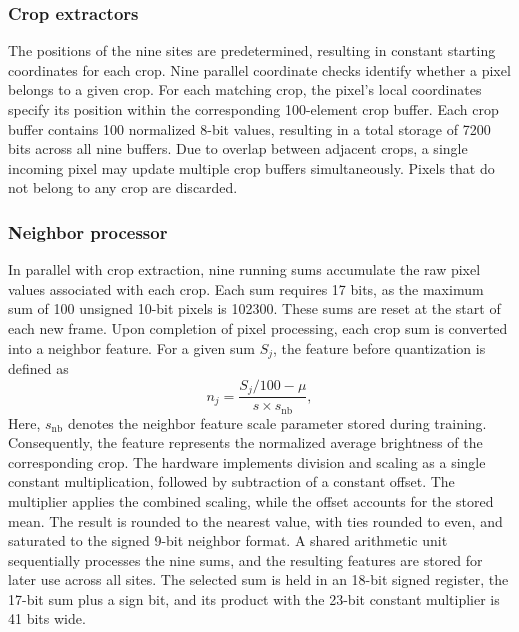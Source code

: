 \subsubsection{Crop extractors}
The positions of the nine sites are predetermined, resulting in constant starting coordinates for each crop. Nine parallel coordinate checks identify whether a pixel belongs to a given crop. For each matching crop, the pixel's local coordinates specify its position within the corresponding 100-element crop buffer. Each crop buffer contains 100 normalized 8-bit values, resulting in a total storage of 7200 bits across all nine buffers. Due to overlap between adjacent crops, a single incoming pixel may update multiple crop buffers simultaneously. Pixels that do not belong to any crop are discarded.
\subsubsection{Neighbor processor}
In parallel with crop extraction, nine running sums accumulate the raw pixel values associated with each crop. Each sum requires 17 bits, as the maximum sum of 100 unsigned 10-bit pixels is 102300. These sums are reset at the start of each new frame. Upon completion of pixel processing, each crop sum is converted into a neighbor feature. For a given sum $S_j$, the feature before quantization is defined as
\[
    n_j = \frac{S_j/100-\mu}{s\times s_{\mathrm{nb}}},
\]
Here, $s_{\mathrm{nb}}$ denotes the neighbor feature scale parameter stored during training. Consequently, the feature represents the normalized average brightness of the corresponding crop. The hardware implements division and scaling as a single constant multiplication, followed by subtraction of a constant offset. The multiplier applies the combined scaling, while the offset accounts for the stored mean. The result is rounded to the nearest value, with ties rounded to even, and saturated to the signed 9-bit neighbor format. A shared arithmetic unit sequentially processes the nine sums, and the resulting features are stored for later use across all sites. The selected sum is held in an 18-bit signed register, the 17-bit sum plus a sign bit, and its product with the 23-bit constant multiplier is 41 bits wide.
